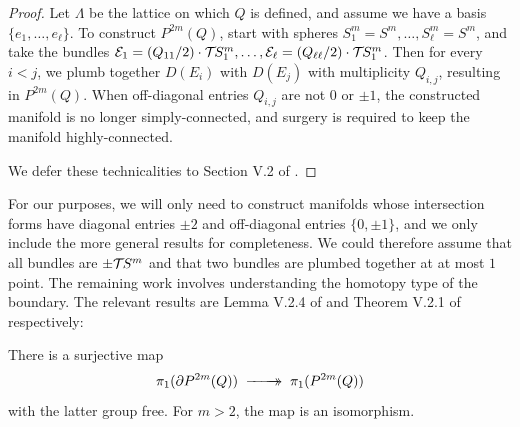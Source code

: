 \begin{proof}
	Let $\Lambda$ be the lattice on which $Q$ is defined, and assume we have a basis $\{e_1,\ldots, e_\ell\}$. To construct $P^{2m}(Q)$, start with spheres $S_1^m=S^m,\ldots, S_\ell^m=S^m$, and take the bundles $\mathcal{E}_1=(Q_{11}/2)\cdot {\mathcal{T}\hspace{-0.1em}} S^m_1,\ldots, \mathcal{E}_\ell=(Q_{\ell\ell}/2)\cdot {\mathcal{T}\hspace{-0.1em}} S^m_1$. Then for every $i<j$, we plumb together $D(E_i)$ with $D(E_j)$ with multiplicity $Q_{i,j}$, resulting in $P^{2m}(Q)$. When off-diagonal entries $Q_{i,j}$ are not $0$ or $\pm 1$, the constructed manifold is no longer simply-connected, and surgery is required to keep the manifold highly-connected.

	We defer these technicalities to Section V.2 of \cite{browder1972surgery}.
\end{proof}

For our purposes, we will only need to construct manifolds whose intersection forms have diagonal entries $\pm 2$ and off-diagonal entries $\{0,\pm 1\}$, and we only include the more general results for completeness. We could therefore assume that all bundles are $\pm {\mathcal{T}\hspace{-0.1em}} S^m$ and that two bundles are plumbed together at at most $1$ point.
%
%
The remaining work involves understanding the homotopy type of the boundary. The relevant results are Lemma V.2.4 of \cite{browder1972surgery} and Theorem V.2.1 of \cite{browder1972surgery} respectively:

\begin{proposition}\label{prop:fundamental-group-plumbing}
	There is a surjective map
	\[\pi_1(\partial P^{2m}(Q))\lkxsurj \pi_1(P^{2m}(Q))\]
	with the latter group free. For $m>2$, the map is an isomorphism.
\end{proposition}

